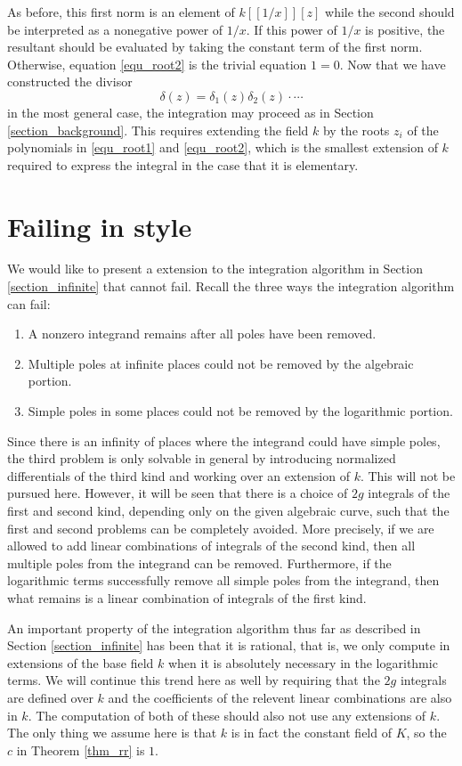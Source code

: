 \documentclass[12pt,reqno]{amsart}
\numberwithin{equation}{section}
\begin{document}
As before, this first norm is an element of $k[[1/x]][z]$ while the second should be interpreted as a nonegative power of $1/x$. If this power of $1/x$ is positive, the resultant should be evaluated by taking the constant term of the first norm. Otherwise, equation \eqref{equ_root2} is the trivial equation $1=0$. Now that we have constructed the divisor
\begin{equation}
\label{equ_deltaz}
 \delta(z) = \delta_1(z)\delta_2(z) \cdot \cdots
\end{equation}
in the most general case, the integration may proceed as in Section \ref{section_background}. This requires extending the field $k$ by the roots $z_i$ of the polynomials in \eqref{equ_root1} and \eqref{equ_root2}, which is the smallest extension of $k$ required to express the integral in the case that it is elementary.


\section{Failing in style}
We would like to present a extension to the integration algorithm in Section \ref{section_infinite} that cannot fail. Recall the three ways the integration algorithm can fail:
\begin{enumerate}
\item A nonzero integrand remains after all poles have been removed.
\item Multiple poles at infinite places could not be removed by the algebraic portion.
\item Simple poles in some places could not be removed by the logarithmic portion.
\end{enumerate}
Since there is an infinity of places where the integrand could have simple poles, the third problem is only solvable in general by introducing normalized differentials of the third kind and working over an extension of $k$. This will not be pursued here. However, it will be seen that there is a choice of $2g$ integrals of the first and second kind, depending only on the given algebraic curve, such that the first and second problems can be completely avoided. More precisely, if we are allowed to add linear combinations of integrals of the second kind, then all multiple poles from the integrand can be removed. Furthermore, if the logarithmic terms successfully remove all simple poles from the integrand, then what remains is a linear combination of integrals of the first kind.

An important property of the integration algorithm thus far as described in Section \ref{section_infinite} has been that it is rational, that is, we only compute in extensions of the base field $k$ when it is absolutely necessary in the logarithmic terms. We will continue this trend here as well by requiring that the $2g$ integrals are defined over $k$ and the coefficients of the relevent linear combinations are also in $k$. The computation of both of these should also not use any extensions of $k$. The only thing we assume here is that $k$ is in fact the constant field of $K$, so the $c$ in Theorem \ref{thm_rr} is $1$.
\end{document}
